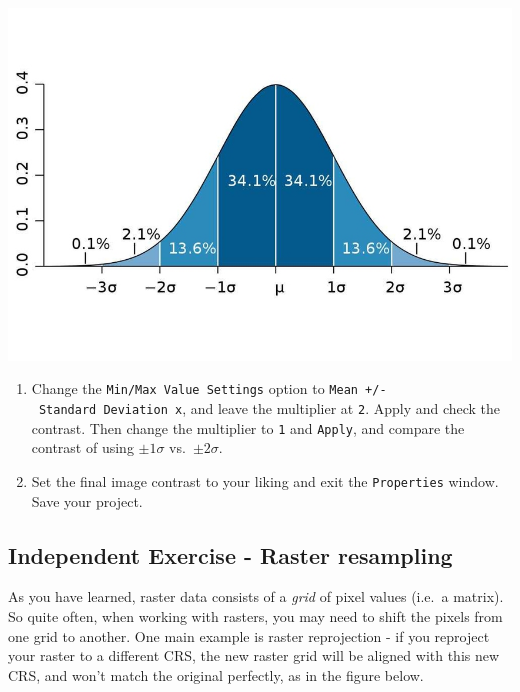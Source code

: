 \documentclass[
  letterpaper,
  DIV=11,
  numbers=noendperiod]{scrreprt}
\begin{document}
\includegraphics{images/lab_6/lab_6_fig11_normal.jpg}

\begin{enumerate}
\def\labelenumi{(\arabic{enumi})}
\setcounter{enumi}{186}
\item
  Change the \texttt{Min/Max\ Value\ Settings} option to
  \texttt{Mean\ +/-\ Standard\ Deviation\ x}, and leave the multiplier
  at \texttt{2}. Apply and check the contrast. Then change the
  multiplier to \texttt{1} and \texttt{Apply}, and compare the contrast
  of using \(\pm 1 \sigma\) vs.~\(\pm 2 \sigma\).
\item
  Set the final image contrast to your liking and exit the
  \texttt{Properties} window. Save your project.
\end{enumerate}

\subsection{Independent Exercise - Raster
resampling}\label{independent-exercise---raster-resampling}

As you have learned, raster data consists of a \emph{grid} of pixel
values (i.e.~a matrix). So quite often, when working with rasters, you
may need to shift the pixels from one grid to another. One main example
is raster reprojection - if you reproject your raster to a different
CRS, the new raster grid will be aligned with this new CRS, and won't
match the original perfectly, as in the figure below.
\end{document}
